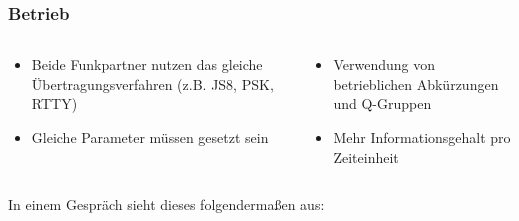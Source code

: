 \begin{frame}
\frametitle{Betrieb}
\begin{columns}
    \begin{column}{0.48\textwidth}
    \begin{itemize}
  \item Beide Funkpartner nutzen das gleiche Übertragungsverfahren (z.B. JS8, PSK, RTTY)
  \item Gleiche Parameter müssen gesetzt sein
  \end{itemize}

    \end{column}
   \begin{column}{0.48\textwidth}
       \begin{itemize}
  \item Verwendung von betrieblichen Abkürzungen und Q-Gruppen
  \item Mehr Informationsgehalt pro Zeiteinheit
  \end{itemize}

   \end{column}
\end{columns}

\end{frame}

\begin{frame}In einem Gespräch sieht dieses folgendermaßen aus:
    \pause{}\pause{}\pause{}\pause{}\pause{}\pause{}

\end{frame}

